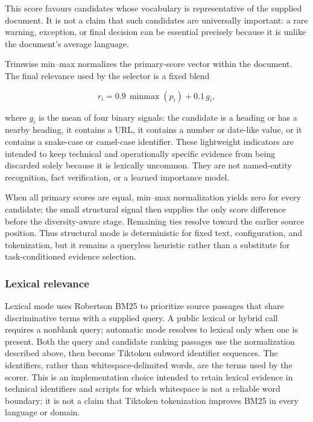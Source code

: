 \documentclass[
]{article}
\begin{document}
This score favours candidates whose vocabulary is representative of the
supplied document. It is not a claim that such candidates are
universally important: a rare warning, exception, or final decision can
be essential precisely because it is unlike the document's average
language.

Trimwise min--max normalizes the primary-score vector within the
document. The final relevance used by the selector is a fixed blend

\[
r_i = 0.9\,\operatorname{minmax}(p_i) + 0.1\,g_i,
\]

where \(g_i\) is the mean of four binary signals: the candidate is a
heading or has a nearby heading, it contains a URL, it contains a number
or date-like value, or it contains a snake-case or camel-case
identifier. These lightweight indicators are intended to keep technical
and operationally specific evidence from being discarded solely because
it is lexically uncommon. They are not named-entity recognition, fact
verification, or a learned importance model.

When all primary scores are equal, min--max normalization yields zero
for every candidate; the small structural signal then supplies the only
score difference before the diversity-aware stage. Remaining ties
resolve toward the earlier source position. Thus structural mode is
deterministic for fixed text, configuration, and tokenization, but it
remains a queryless heuristic rather than a substitute for
task-conditioned evidence selection.

\subsubsection{Lexical relevance}\label{lexical-relevance}

Lexical mode uses Robertson BM25 \citep{robertson-zaragoza-2009-bm25} to
prioritize source passages that share discriminative terms with a
supplied query. A public lexical or hybrid call requires a nonblank
query; automatic mode resolves to lexical only when one is present. Both
the query and candidate ranking passages use the normalization described
above, then become Tiktoken subword identifier sequences. The
identifiers, rather than whitespace-delimited words, are the terms used
by the scorer. This is an implementation choice intended to retain
lexical evidence in technical identifiers and scripts for which
whitespace is not a reliable word boundary; it is not a claim that
Tiktoken tokenization improves BM25 in every language or domain.
\end{document}
